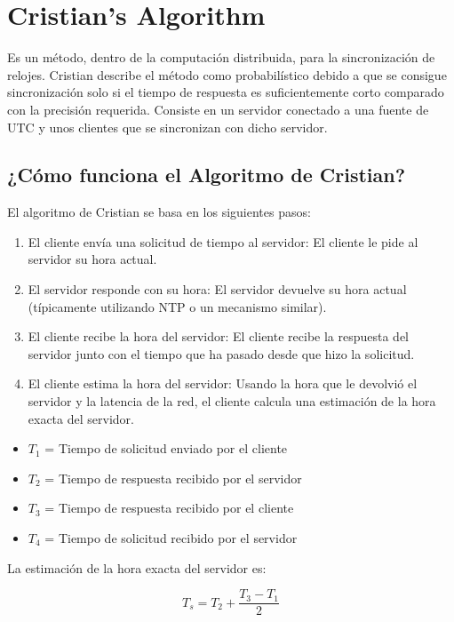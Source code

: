 \documentclass[a4paper,12pt]{report}
\begin{document}
\section{Cristian’s Algorithm}
Es un método, dentro de la computación distribuida, para la sincronización de relojes. Cristian describe el método como probabilístico debido a que se consigue sincronización solo si el tiempo de respuesta es suficientemente corto comparado con la precisión requerida. Consiste en un servidor conectado a una fuente de UTC y unos clientes que se sincronizan con dicho servidor. \cite{cristian}
\subsection{¿Cómo funciona el Algoritmo de Cristian?}
El algoritmo de Cristian se basa en los siguientes pasos:
\begin{enumerate}
    \item El cliente envía una solicitud de tiempo al servidor: El cliente le pide al servidor su hora actual.
    \item El servidor responde con su hora: El servidor devuelve su hora actual (típicamente utilizando NTP o un mecanismo similar).
    \item El cliente recibe la hora del servidor: El cliente recibe la respuesta del servidor junto con el tiempo que ha pasado desde que hizo la solicitud.
    \item El cliente estima la hora del servidor: Usando la hora que le devolvió el servidor y la latencia de la red, el cliente calcula una estimación de la hora exacta del servidor.
\end{enumerate}

\begin{itemize}
  \item \( T_1 \) = Tiempo de solicitud enviado por el cliente
  \item \( T_2 \) = Tiempo de respuesta recibido por el servidor
  \item \( T_3 \) = Tiempo de respuesta recibido por el cliente
  \item \( T_4 \) = Tiempo de solicitud recibido por el servidor
\end{itemize}

La estimación de la hora exacta del servidor es:

\[
T_s = T_2 + \frac{T_3 - T_1}{2}
\]
\end{document}

